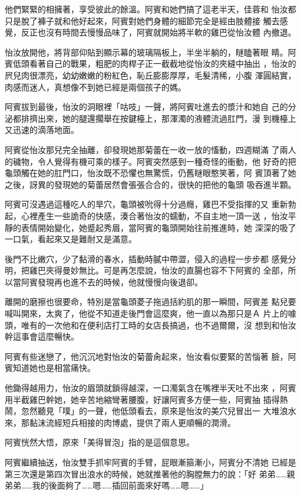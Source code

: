 他們緊緊的相擁著，享受彼此的餘溫。阿賓和她們搞了這老半天，佳蓉和
怡汝都只是脫了褲子就和他好起來，阿賓對她們身體的細節完全是經由肢體接
觸去感覺，反正也沒有時間去慢慢品味了，阿賓就開始將半軟的雞巴從怡汝體
內撤退。

怡汝放開他，將背部仰貼到顯示幕的玻璃隔板上，半坐半躺的，瞇瞌著眼
睛。阿賓低頭看著自己的戰果，粗肥的肉桿子正一截截地從怡汝的夾縫中抽出
，怡汝的屄兒肉很漂亮，幼幼嫩嫩的粉紅色，恥丘膨膨厚厚，毛髮清稀，小腹
渾圓結實，肉感而迷人，真想像不到她已經是兩個孩子的媽。

阿賓拔到最後，怡汝的洞眼裡「咕吱」一聲，將阿賓吐進去的漿汁和她自
己的分泌都排擠出來，她的腿還擱舉在按鍵檯上，那渾濁的液體流過肛門，漫
到機檯上又迅速的滴落地面。

阿賓從怡汝那兒完全抽離，卻發現她那菊蕾在一收一放的慉動，四週糊滿
了兩人的穢物，令人覺得有機可乘的樣子。阿賓突然感到一種奇怪的衝動，他
好奇的把龜頭觸在她的肛門口，怡汝既不恐懼也無驚慌，仍舊瞇眼憨笑著，阿
賓頂著了她之後，訝異的發現她的菊蕾居然會張張合合的，很快的把他的龜頭
吸吞進半顆。

阿賓可沒遇過這種吃人的旱穴，龜頭被吮得十分過癮，雞巴不受指揮的又
重新勃起，心裡產生一些詭奇的快感，湊合著怡汝的蠕動，不自主地一頂一送
，怡汝平靜的表情開始變化，她蹙起秀眉，當阿賓的龜頭開始往前推進時，她
深深的吸了一口氣，看起來又是難耐又是滿意。

後門不比嫩穴，少了黏滑的春水，插動時膩中帶澀，侵入的過程一步步都
感覺分明，把雞巴夾得曼妙無比。可是再怎麼說，怡汝的直腸也容不下阿賓的
全部，所以當阿賓發現再也進不去的時候，他就慢慢向後退卻。

離開的磨擦也很要命，特別是當龜頭菱子拖過括約肌的那一瞬間，阿賓差
點兒要喊叫開來，太爽了，他從不知道走後門會這麼爽，他一直以為那只是Ａ
片上的噱頭，唯有的一次他和在便利店打工時的女店長搞過，也不過爾爾，沒
想到和怡汝幹這事會這麼暢快。

阿賓有些迷戀了，他沉沉地對怡汝的菊蕾肏起來，怡汝看似要緊的苦惱著
臉，阿賓知道她也是相當痛快。

他鋤得越用力，怡汝的眉頭就鎖得越深，一口濁氣含在嘴裡半天吐不出來
，阿賓用半截雞巴幹她，她辛苦地縮彎著腰腹，好讓阿賓多方便一些，阿賓抽
插得熱鬧，忽然聽見「噗」的一聲，他低頭看去，原來是怡汝的美穴兒冒出一
大堆浪水來，那黏沫流經短兵相接的肉博處，提供了兩人更順暢的潤滑。

阿賓恍然大悟，原來「美得冒泡」指的是這個意思。

阿賓繼續抽送，怡汝雙手抓牢阿賓的手臂，屁眼漸箍漸小，阿賓分不清她
已經是第三次還是第四次冒出浪水的時候，她就推著他的胸膛無力的說：「好
弟弟……親弟弟……我的後面夠了……嗯……插回前面來好嗎……嗯……」

